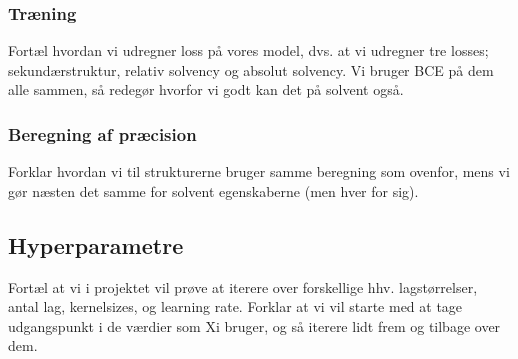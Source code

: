 \subsubsection{Træning}
Fortæl hvordan vi udregner loss på vores model, dvs. at vi udregner tre losses; sekundærstruktur, relativ solvency og absolut solvency. Vi bruger BCE på dem alle sammen, så redegør hvorfor vi godt kan det på solvent også.

\subsubsection{Beregning af præcision}
Forklar hvordan vi til strukturerne bruger samme beregning som ovenfor, mens vi gør næsten det samme for solvent egenskaberne (men hver for sig).

\subsection{Hyperparametre}
Fortæl at vi i projektet vil prøve at iterere over forskellige hhv. lagstørrelser, antal lag, kernelsizes, og learning rate.
Forklar at vi vil starte med at tage udgangspunkt i de værdier som Xi bruger, og så iterere lidt frem og tilbage over dem.





